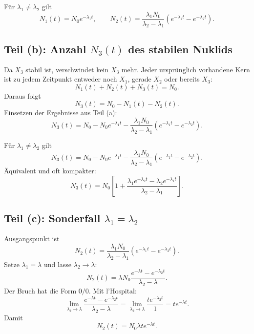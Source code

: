 \documentclass[11pt,a4paper]{scrartcl}
\newcommand{\paren}[1]{\left( #1 \right)}
\newcommand{\bracket}[1]{\left[ #1 \right]}
\theoremstyle{definition}
\theoremstyle{plain}
\theoremstyle{remark}
\begin{document}
\begin{answerbox}
Für $\lambda_1\neq\lambda_2$ gilt
\[
    \boxed{N_1(t)=N_0e^{-\lambda_1t}},
    \qquad
    \boxed{N_2(t)=\frac{\lambda_1N_0}{\lambda_2-\lambda_1}
    \paren{e^{-\lambda_1t}-e^{-\lambda_2t}}}.
\]
\end{answerbox}

\subsection{Teil (b): Anzahl $N_3(t)$ des stabilen Nuklids}

\begin{calculationbox}
Da $X_3$ stabil ist, verschwindet kein $X_3$ mehr. Jeder ursprünglich vorhandene Kern ist zu jedem Zeitpunkt entweder noch $X_1$, gerade $X_2$ oder bereits $X_3$:
\[
    N_1(t)+N_2(t)+N_3(t)=N_0.
\]
Daraus folgt
\[
    N_3(t)=N_0-N_1(t)-N_2(t).
\]
Einsetzen der Ergebnisse aus Teil (a):
\[
    N_3(t)
    =N_0-N_0e^{-\lambda_1t}
    -\frac{\lambda_1N_0}{\lambda_2-\lambda_1}
    \paren{e^{-\lambda_1t}-e^{-\lambda_2t}}.
\]
\end{calculationbox}

\begin{answerbox}
Für $\lambda_1\neq\lambda_2$ gilt
\[
    \boxed{
    N_3(t)
    =N_0-N_0e^{-\lambda_1t}
    -\frac{\lambda_1N_0}{\lambda_2-\lambda_1}
    \paren{e^{-\lambda_1t}-e^{-\lambda_2t}}
    }.
\]
Äquivalent und oft kompakter:
\[
    \boxed{
    N_3(t)=N_0\bracket{1+\frac{\lambda_1e^{-\lambda_2t}-\lambda_2e^{-\lambda_1t}}{\lambda_2-\lambda_1}}
    }.
\]
\end{answerbox}

\subsection{Teil (c): Sonderfall $\lambda_1=\lambda_2$}

\begin{calculationbox}[title=Grenzwert mit l'Hospital]
Ausgangspunkt ist
\[
    N_2(t)=\frac{\lambda_1N_0}{\lambda_2-\lambda_1}
    \paren{e^{-\lambda_1t}-e^{-\lambda_2t}}.
\]
Setze $\lambda_1=\lambda$ und lasse $\lambda_2\to\lambda$:
\[
    N_2(t)=\lambda N_0\frac{e^{-\lambda t}-e^{-\lambda_2t}}{\lambda_2-\lambda}.
\]
Der Bruch hat die Form $0/0$. Mit l'Hospital:
\[
    \lim_{\lambda_2\to\lambda}
    \frac{e^{-\lambda t}-e^{-\lambda_2t}}{\lambda_2-\lambda}
    =
    \lim_{\lambda_2\to\lambda}
    \frac{t e^{-\lambda_2t}}{1}
    =t e^{-\lambda t}.
\]
Damit
\[
    \boxed{N_2(t)=N_0\lambda t e^{-\lambda t}}.
\]
\end{calculationbox}
\end{document}
